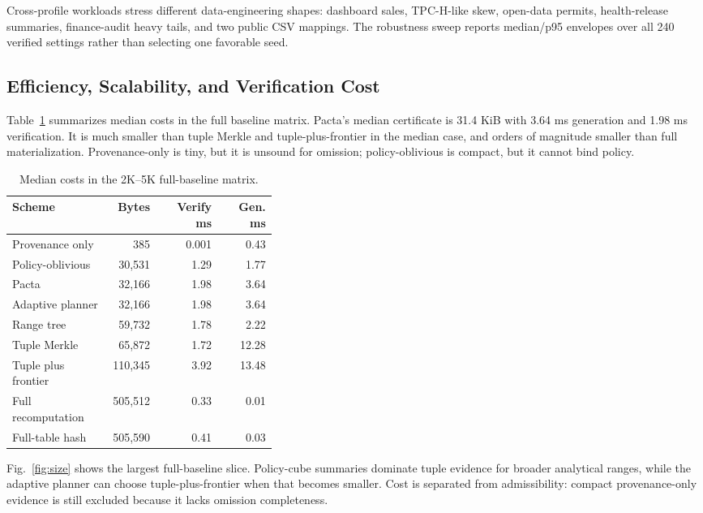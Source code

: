 \documentclass[conference]{IEEEtran}
\newcommand{\sys}{Pacta\xspace}
\begin{document}
Cross-profile workloads stress different data-engineering shapes: dashboard sales, TPC-H-like skew, open-data permits, health-release summaries, finance-audit heavy tails, and two public CSV mappings. The robustness sweep reports median/p95 envelopes over all 240 verified settings rather than selecting one favorable seed.

\subsection{Efficiency, Scalability, and Verification Cost}
Table~\ref{tab:medians} summarizes median costs in the full baseline matrix. \sys's median certificate is 31.4 KiB with 3.64 ms generation and 1.98 ms verification. It is much smaller than tuple Merkle and tuple-plus-frontier in the median case, and orders of magnitude smaller than full materialization. Provenance-only is tiny, but it is unsound for omission; policy-oblivious is compact, but it cannot bind policy.

\begin{table}[t]
\centering
\caption{Median costs in the 2K--5K full-baseline matrix.}
\label{tab:medians}
\scriptsize
\begin{tabular}{p{0.38\linewidth}rrr}
\toprule
Scheme & Bytes & Verify ms & Gen. ms \\
\midrule
Provenance only & 385 & 0.001 & 0.43 \\
Policy-oblivious & 30,531 & 1.29 & 1.77  \\
\sys & 32,166 & 1.98 & 3.64  \\
Adaptive planner & 32,166 & 1.98 & 3.64  \\
Range tree & 59,732 & 1.78 & 2.22  \\
Tuple Merkle & 65,872 & 1.72 & 12.28  \\
Tuple plus frontier & 110,345 & 3.92 & 13.48  \\
Full recomputation & 505,512 & 0.33 & 0.01  \\
Full-table hash & 505,590 & 0.41 & 0.03  \\
\bottomrule
\end{tabular}
\end{table}

Fig.~\ref{fig:size} shows the largest full-baseline slice. Policy-cube summaries dominate tuple evidence for broader analytical ranges, while the adaptive planner can choose tuple-plus-frontier when that becomes smaller. Cost is separated from admissibility: compact provenance-only evidence is still excluded because it lacks omission completeness.
\end{document}
